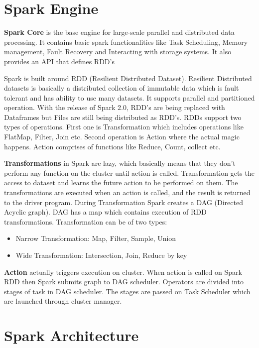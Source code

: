 \section{Spark Engine}

{\bf Spark Core} is the base engine for large-scale parallel and distributed data processing.
It contains basic spark functionalities like Task Scheduling, Memory management, Fault
Recovery and Interacting with storage systems. It also provides an API that defines RDD's


Spark is built around  RDD (Resilient Distributed Dataset). Resilient Distributed datasets
is basically a distributed collection of immutable data which is fault tolerant and
has ability to use many datasets. It supports parallel and partitioned operation. With
the release of Spark 2.0, RDD's are being replaced with Dataframes but Files are still
being distributed as RDD's. RDDs support two types of operations. First one is
Transformation which includes operations like FlatMap, Filter, Join etc. Second
operation is Action where the actual magic happens. Action comprises of functions
like Reduce, Count, collect etc.


{\bf Transformations} in Spark are lazy, which basically means that they don't perform any
function on the cluster until action is called. Transformation gets the access to dataset and
learns the future action to be performed on them. The transformations are executed  when an
action is called, and the result is returned to the driver program. During Transformation Spark
creates a DAG (Directed Acyclic graph). DAG has a map which contains execution of RDD
transformations. Transformation can be of two types:

\begin{itemize}
   \item Narrow Transformation: Map, Filter, Sample, Union
   \item Wide Transformation: Intersection, Join, Reduce by key
\end{itemize}

{\bf Action} actually triggers execution on cluster. When action is called on Spark RDD then Spark
submits graph to DAG scheduler. Operators are divided into stages of task in DAG scheduler.
The stages are passed on Task Scheduler which are launched through cluster manager.

\section{Spark Architecture}

